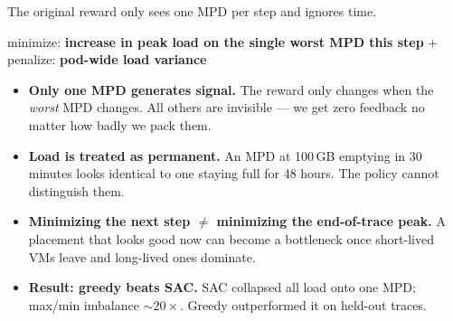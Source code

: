 \documentclass[11pt,aspectratio=43]{beamer}
\begin{document}
\begin{frame}{The original reward only sees one MPD per step and ignores time.}

  \begin{center}
    minimize: \textbf{increase in peak load on the single worst MPD this step}
    \quad$+$\quad penalize: \textbf{pod-wide load variance}
  \end{center}

  \vspace{0.4em}

  \small
  \begin{itemize}
    \setlength{\itemsep}{0.35em}
    \item \textbf{Only one MPD generates signal.}
          The reward only changes when the \emph{worst} MPD changes.
          All others are invisible --- we get zero feedback no matter how badly we pack them.

    \item \textbf{Load is treated as permanent.}
          An MPD at 100\,GB emptying in 30 minutes looks identical to one
          staying full for 48 hours. The policy cannot distinguish them.

    \item \textbf{Minimizing the next step $\neq$ minimizing the end-of-trace peak.}
          A placement that looks good now can become a bottleneck once
          short-lived VMs leave and long-lived ones dominate.

    \item \textbf{Result: greedy beats SAC.}
          SAC collapsed all load onto one MPD; max/min imbalance ${\sim}20\times$.
          Greedy outperformed it on held-out traces.
  \end{itemize}

\end{frame}

\end{document}
